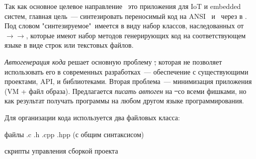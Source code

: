 \label{synth}\secdown


\clearpage
Так как основное целевое направление \met\ это приложения для IoT и embedded систем,
главная цель\ --- синтезировать переносимый код на ANSI \ci\ и \cpp\ через  в . Под словом "синтезируемое"\ имеется в виду
набор классов, наследованных от $\rightarrow$$\rightarrow$,
которые имеют набор методов генерирующих код на соответствующем языке
в виде строк или текстовых файлов.

\bigskip
\emph{Автогенерация кода} решает основную проблему \st, которая не позволяет использовать его
в современных разработках\ --- обеспечение  с существующими проектами,
API, и библиотеками.
Вторая проблема\ --- минимизация приложения (VM + файл образа).
Предлагается \textit{писать автоген} на \st\ со всеми фишками, но как результат получать
программы на любом другом языке программирования.

\clearpage
{}\label{cfile}\label{cmakefile}

Для организации кода используется два файловых класса:
\begin{description}
    \item{\emph{}} файлы .c .h .cpp .hpp (с общим синтаксисом)
    \item{\emph{}} скрипты управления сборкой проекта
\end{description}

{}




\secup
